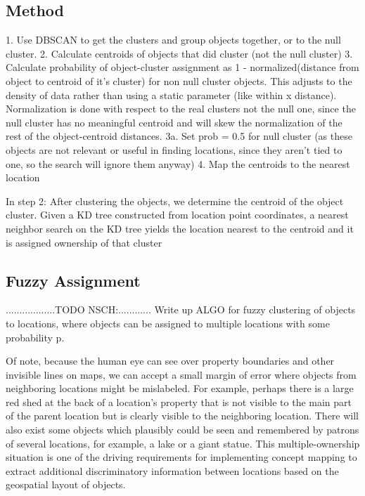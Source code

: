 \subsection{Method}
1. Use DBSCAN to get the clusters and group objects together, or to the null cluster.
2. Calculate centroids of objects that did cluster (not the null cluster)
3. Calculate probability of object-cluster assignment as 1 - normalized(distance from object to centroid of it's cluster) for non null cluster objects. This adjusts to the density of data rather than using a static parameter (like within x distance). Normalization is done with respect to the real clusters not the null one, since the null cluster has no meaningful centroid and will skew the normalization of the rest of the object-centroid distances.
3a. Set prob = 0.5 for null cluster (as these objects are not relevant or useful in finding locations, since they aren't tied to one, so the search will ignore them anyway)
4. Map the centroids to the nearest location


In step 2: After clustering the objects, we determine the centroid of the object cluster. Given a KD tree constructed from location point coordinates, a nearest neighbor search on the KD tree yields the location nearest to the centroid and it is assigned ownership of that cluster



\subsection{Fuzzy Assignment}
..................TODO NSCH:............ Write up ALGO for fuzzy clustering of objects to locations, where objects can be assigned to multiple locations with some probability p.

Of note, because the human eye can see over property boundaries and other invisible lines on maps, we can accept a small margin of error where objects from neighboring locations might be mislabeled. For example, perhaps there is a large red shed at the back of a location's property that is not visible to the main part of the parent location but is clearly visible to the neighboring location.
There will also exist some objects which plausibly could be seen and remembered by patrons of several locations, for example, a lake or a giant statue. 
This multiple-ownership situation is one of the driving requirements for implementing concept mapping to extract additional discriminatory information between locations based on the geospatial layout of objects.


